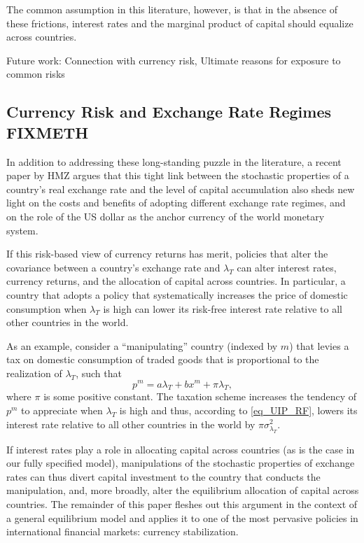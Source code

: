 \documentclass{ar-1col}
\begin{document}
The common assumption in this literature, however, is that in the absence of these frictions, interest rates and the marginal product of capital should equalize across countries. 

Future work: Connection with currency risk, Ultimate reasons for exposure to common risks


\subsection{Currency Risk and Exchange Rate Regimes FIXMETH}

In addition to addressing these long-standing puzzle in the literature, a recent paper by HMZ argues that this tight link between the stochastic properties of a country's real exchange rate and the level of capital accumulation also sheds new light on the costs and benefits of adopting different exchange rate regimes, and on the role of the US dollar as the anchor currency of the world monetary system. 


If this risk-based
view of currency returns has merit, policies that alter the covariance
between a country's exchange rate and $\lambda_T $
can alter interest rates, currency returns, and the allocation of
capital across countries. In particular, a country that adopts a
policy that systematically increases the price of domestic consumption when $\lambda _{T}$ is high can lower its risk-free
interest rate relative to all other countries in the world.

As an example, consider a ``manipulating'' country (indexed by $ m $)
that levies a tax on domestic consumption of traded goods that is
proportional to the realization of \(\lambda_{T}\), such that
\begin{equation*}
  p^{m}=a\lambda _{T}+b x^{m}+\pi \lambda_{T},
\end{equation*}%
where \(\pi\) is some positive constant. The taxation scheme increases
the tendency of \(p^{m}\) to appreciate when \(\lambda_{T}\) is high
and thus, according to \eqref{eq_UIP_RF}, lowers its interest rate
relative to all other countries in the world by
\(\pi \sigma^2_{\lambda_T}\).

If interest rates play a role in allocating capital across countries
(as is the case in our fully specified model), manipulations of the
stochastic properties of exchange rates can thus divert capital
investment to the country that conducts the manipulation, and, more
broadly, alter the equilibrium allocation of capital across countries.
The remainder of this paper fleshes out this argument in the context
of a general equilibrium model and
applies it to one of the most pervasive policies in international
financial markets: currency stabilization.
\end{document}
